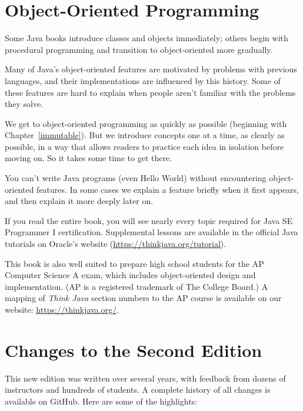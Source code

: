 \section*{Object-Oriented Programming}

Some Java books introduce classes and objects immediately; others begin with procedural programming and transition to object-oriented more gradually.

Many of Java's object-oriented features are motivated by problems with previous languages, and their implementations are influenced by this history.
Some of these features are hard to explain when people aren't familiar with the problems they solve.

We get to object-oriented programming as quickly as possible (beginning with Chapter~\ref{immutable}).
But we introduce concepts one at a time, as clearly as possible, in a way that allows readers to practice each idea in isolation before moving on.
So it takes some time to get there.

You can't write Java programs (even Hello World) without encountering object-oriented features.
In some cases we explain a feature briefly when it first appears, and then explain it more deeply later on.

If you read the entire book, you will see nearly every topic required for Java SE Programmer I certification.
Supplemental lessons are available in the official Java tutorials on Oracle's website (\url{https://thinkjava.org/tutorial}).

This book is also well suited to prepare high school students for the AP Computer Science A exam, which includes object-oriented design and implementation.
(AP is a registered trademark of The College Board.)
A mapping of {\it Think Java} section numbers to the AP course is available on our website: \url{https://thinkjava.org/}.


\section*{Changes to the Second Edition}

This new edition was written over several years, with feedback from dozens of instructors and hundreds of students.
A complete history of all changes is available on GitHub.
Here are some of the highlights:

